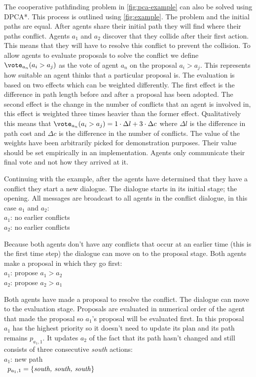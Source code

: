 The cooperative pathfinding problem in \autoref{fig:pca-example} can also be 
solved using DPCA*. This process is outlined using \autoref{fig:example}. The 
problem and the initial paths are equal. After agents share their initial path 
they will find where their paths conflict. Agents $a_1$ and $a_2$ discover that 
they collide after their first action. This means that they will have to 
resolve this conflict to prevent the collision. To allow agents to evaluate 
proposals to solve the conflict we define $\vote_{a_n}(a_i > a_j)$ as 
the vote of agent $a_n$ on the proposal $a_i > a_j$. This represents how 
suitable an agent thinks that a particular proposal is. The evaluation  is 
based on two effects which can be weighted
differently. The first effect is the difference in path length before and after
a proposal has been adopted. The second effect is the change in the number of
conflicts that an agent is involved in, this effect is weighted three times
heavier than the former effect. Qualitatively this means that $\vote_{a_n}(a_i
> a_j) = 1 \cdot \Delta l + 3 \cdot \Delta c$ where $\Delta l$ is the
difference in path cost and $\Delta c$ is the difference in the number of 
conflicts. The 
value of the weights have been arbitrarily picked for demonstration purposes. 
Their value should be set empirically in an implementation.
Agents only communicate their final vote and not how they arrived at it.

Continuing with the example, after the agents have determined that they have a
conflict they start a new dialogue. The dialogue starts in its initial stage;
the opening. All messages are broadcast to all agents in the conflict dialogue,
in this case $a_1$ and $a_2$:
\\ \-\qquad $a_1$: no earlier conflicts
\\ \-\qquad $a_2$: no earlier conflicts

Because both agents don't have any conflicts that occur at an earlier time
(this is the first time step) the dialogue can move on to the proposal stage.
Both agents make a proposal in which they go first:
\\ \-\qquad $a_1$: propose $a_1 > a_2$
\\ \-\qquad $a_2$: propose $a_2 > a_1$

Both agents have made a proposal to resolve the conflict. The dialogue can
move to the evaluation stage. Proposals are evaluated in numerical order of the 
agent that made the proposal so $a_1$'s proposal will be evaluated first. In 
this proposal $a_1$ has the highest priority so it doesn't need to update its 
plan and its path remains $p_{a_1,1}$. It updates $a_2$ of the fact that its 
path hasn't changed and still consists of three consecutive \emph{south} 
actions:
\\ \-\qquad $a_1$: new path
\\ \-\qquad\quad\,\; $p_{a_1,1} = \{\text{\emph{south, south, south}}\}$

